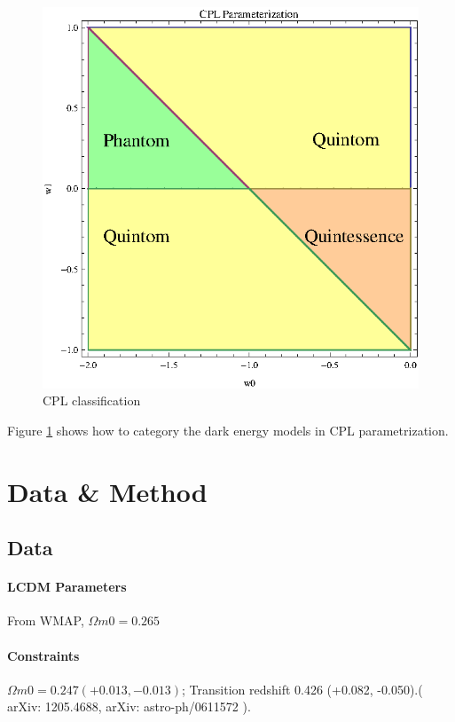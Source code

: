\documentclass[12pt,a4paper]{article}
\begin{document}
\begin{figure}[htpb]
\centering
\includegraphics[width=400pt]{CPL_Classification.eps}
\caption{CPL classification}\label{fig-CPL_Classification}
\end{figure}

Figure \ref{fig-CPL_Classification} shows how to category the dark energy models in CPL parametrization.


\section{Data \& Method}

\subsection{Data}

\paragraph{LCDM Parameters}
From WMAP, $\Omega m0 = 0.265$

\paragraph{Constraints}
$\Omega m0=0.247 (+0.013,-0.013)$; Transition redshift 0.426 (+0.082, -0.050).( arXiv: 1205.4688, arXiv: astro-ph/0611572 ).
\end{document}
